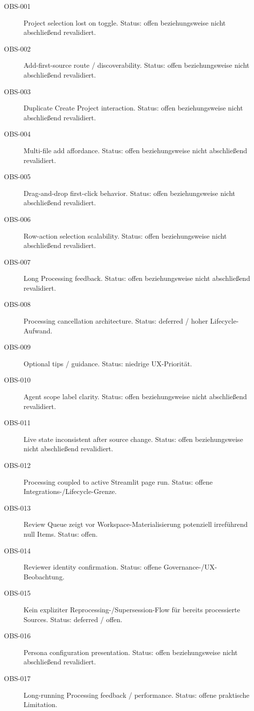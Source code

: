 \begin{description}
    \item[OBS-001] Project selection lost on toggle. Status: offen beziehungsweise nicht abschließend revalidiert.
    \item[OBS-002] Add-first-source route / discoverability. Status: offen beziehungsweise nicht abschließend revalidiert.
    \item[OBS-003] Duplicate Create Project interaction. Status: offen beziehungsweise nicht abschließend revalidiert.
    \item[OBS-004] Multi-file add affordance. Status: offen beziehungsweise nicht abschließend revalidiert.
    \item[OBS-005] Drag-and-drop first-click behavior. Status: offen beziehungsweise nicht abschließend revalidiert.
    \item[OBS-006] Row-action selection scalability. Status: offen beziehungsweise nicht abschließend revalidiert.
    \item[OBS-007] Long Processing feedback. Status: offen beziehungsweise nicht abschließend revalidiert.
    \item[OBS-008] Processing cancellation architecture. Status: deferred / hoher Lifecycle-Aufwand.
    \item[OBS-009] Optional tips / guidance. Status: niedrige UX-Priorität.
    \item[OBS-010] Agent scope label clarity. Status: offen beziehungsweise nicht abschließend revalidiert.
    \item[OBS-011] Live state inconsistent after source change. Status: offen beziehungsweise nicht abschließend revalidiert.
    \item[OBS-012] Processing coupled to active Streamlit page run. Status: offene Integrations-/Lifecycle-Grenze.
    \item[OBS-013] Review Queue zeigt vor Workspace-Materialisierung potenziell irreführend null Items. Status: offen.
    \item[OBS-014] Reviewer identity confirmation. Status: offene Governance-/UX-Beobachtung.
    \item[OBS-015] Kein expliziter Reprocessing-/Supersession-Flow für bereits processierte Sources. Status: deferred / offen.
    \item[OBS-016] Persona configuration presentation. Status: offen beziehungsweise nicht abschließend revalidiert.
    \item[OBS-017] Long-running Processing feedback / performance. Status: offene praktische Limitation.

\end{description}
